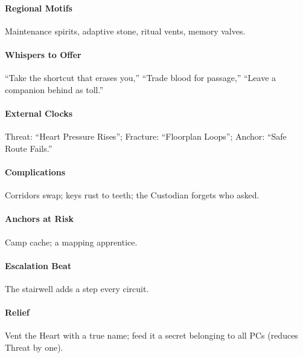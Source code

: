 \paragraph{Regional Motifs} Maintenance spirits, adaptive stone, ritual vents, memory valves.
\paragraph{Whispers to Offer} ``Take the shortcut that erases you,'' ``Trade blood for passage,'' ``Leave a companion behind as toll.''
\paragraph{External Clocks} Threat: ``Heart Pressure Rises''; Fracture: ``Floorplan Loops''; Anchor: ``Safe Route Fails.''
\paragraph{Complications} Corridors swap; keys rust to teeth; the Custodian forgets who asked.
\paragraph{Anchors at Risk} Camp cache; a mapping apprentice.
\paragraph{Escalation Beat} The stairwell adds a step every circuit.
\paragraph{Relief} Vent the Heart with a true name; feed it a secret belonging to all PCs (reduces Threat by one).
